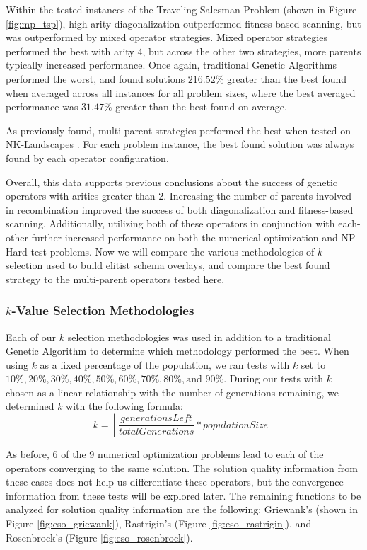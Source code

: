 Within the tested instances of the Traveling Salesman Problem (shown in Figure \ref{fig:mp_tsp}), high-arity diagonalization outperformed fitness-based scanning, but was outperformed by mixed operator strategies. Mixed operator strategies performed the best with arity 4, but across the other two strategies, more parents typically increased performance. Once again, traditional Genetic Algorithms performed the worst, and found solutions $216.52\%$ greater than the best found when averaged across all instances for all problem sizes, where the best averaged performance was $31.47\%$ greater than the best found on average.

As previously found, multi-parent strategies performed the best when tested on NK-Landscapes \cite{Eiben96}. For each problem instance, the best found solution was always found by each operator configuration.

Overall, this data supports previous conclusions about the success of genetic operators with arities greater than $2$. Increasing the number of parents involved in recombination improved the success of both diagonalization and fitness-based scanning. Additionally, utilizing both of these operators in conjunction with each-other further increased performance on both the numerical optimization and NP-Hard test problems. Now we will compare the various methodologies of $k$ selection used to build elitist schema overlays, and compare the best found strategy to the multi-parent operators tested here. 

\subsubsection*{$k$-Value Selection Methodologies}
Each of our $k$ selection methodologies was used in addition to a traditional Genetic Algorithm to determine which methodology performed the best. When using $k$ as a fixed percentage of the population, we ran tests with $k$ set to $10\%, 20\%, 30\%, 40\%, 50\%, 60\%, 70\%, 80\%,\text{and } 90\%$. During our tests with $k$ chosen as a linear relationship with the number of generations remaining, we determined $k$ with the following formula:
\[
k = \left\lfloor \frac{generationsLeft}{totalGenerations} * populationSize \right\rfloor
\]

As before, 6 of the 9 numerical optimization problems lead to each of the operators converging to the same solution. The solution quality information from these cases does not help us differentiate these operators, but the convergence information from these tests will be explored later. The remaining functions to be analyzed for solution quality information are the following: Griewank's (shown in Figure \ref{fig:eso_griewank}), Rastrigin's (Figure \ref{fig:eso_rastrigin}), and Rosenbrock's (Figure \ref{fig:eso_rosenbrock}).

